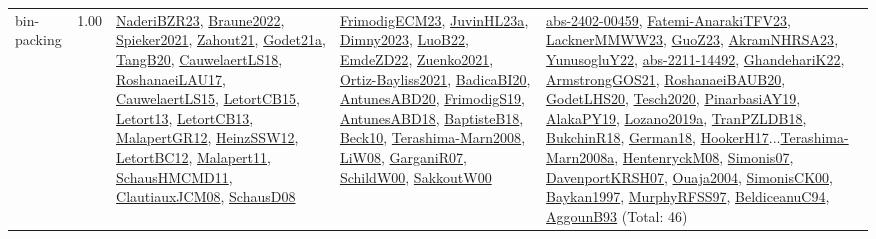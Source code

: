 {\begin{longtable}{p{3cm}r>{\raggedright\arraybackslash}p{6cm}>{\raggedright\arraybackslash}p{6cm}>{\raggedright\arraybackslash}p{8cm}}
\index{bin-packing}\index{Constraints!bin-packing}bin-packing &  1.00 & \hyperref[detail:NaderiBZR23]{NaderiBZR23}, \hyperref[detail:Braune2022]{Braune2022}, \hyperref[detail:Spieker2021]{Spieker2021}, \hyperref[detail:Zahout21]{Zahout21}, \hyperref[detail:Godet21a]{Godet21a}, \hyperref[detail:TangB20]{TangB20}, \hyperref[detail:CauwelaertLS18]{CauwelaertLS18}, \hyperref[detail:RoshanaeiLAU17]{RoshanaeiLAU17}, \hyperref[detail:CauwelaertLS15]{CauwelaertLS15}, \hyperref[detail:LetortCB15]{LetortCB15}, \hyperref[detail:Letort13]{Letort13}, \hyperref[detail:LetortCB13]{LetortCB13}, \hyperref[detail:MalapertGR12]{MalapertGR12}, \hyperref[detail:HeinzSSW12]{HeinzSSW12}, \hyperref[detail:LetortBC12]{LetortBC12}, \hyperref[detail:Malapert11]{Malapert11}, \hyperref[detail:SchausHMCMD11]{SchausHMCMD11}, \hyperref[detail:ClautiauxJCM08]{ClautiauxJCM08}, \hyperref[detail:SchausD08]{SchausD08} & \hyperref[detail:FrimodigECM23]{FrimodigECM23}, \hyperref[detail:JuvinHL23a]{JuvinHL23a}, \hyperref[detail:Dimny2023]{Dimny2023}, \hyperref[detail:LuoB22]{LuoB22}, \hyperref[detail:EmdeZD22]{EmdeZD22}, \hyperref[detail:Zuenko2021]{Zuenko2021}, \hyperref[detail:Ortiz-Bayliss2021]{Ortiz-Bayliss2021}, \hyperref[detail:BadicaBI20]{BadicaBI20}, \hyperref[detail:AntunesABD20]{AntunesABD20}, \hyperref[detail:FrimodigS19]{FrimodigS19}, \hyperref[detail:AntunesABD18]{AntunesABD18}, \hyperref[detail:BaptisteB18]{BaptisteB18}, \hyperref[detail:Beck10]{Beck10}, \hyperref[detail:Terashima-Marn2008]{Terashima-Marn2008}, \hyperref[detail:LiW08]{LiW08}, \hyperref[detail:GarganiR07]{GarganiR07}, \hyperref[detail:SchildW00]{SchildW00}, \hyperref[detail:SakkoutW00]{SakkoutW00} & \hyperref[detail:abs-2402-00459]{abs-2402-00459}, \hyperref[detail:Fatemi-AnarakiTFV23]{Fatemi-AnarakiTFV23}, \hyperref[detail:LacknerMMWW23]{LacknerMMWW23}, \hyperref[detail:GuoZ23]{GuoZ23}, \hyperref[detail:AkramNHRSA23]{AkramNHRSA23}, \hyperref[detail:YunusogluY22]{YunusogluY22}, \hyperref[detail:abs-2211-14492]{abs-2211-14492}, \hyperref[detail:GhandehariK22]{GhandehariK22}, \hyperref[detail:ArmstrongGOS21]{ArmstrongGOS21}, \hyperref[detail:RoshanaeiBAUB20]{RoshanaeiBAUB20}, \hyperref[detail:GodetLHS20]{GodetLHS20}, \hyperref[detail:Tesch2020]{Tesch2020}, \hyperref[detail:PinarbasiAY19]{PinarbasiAY19}, \hyperref[detail:AlakaPY19]{AlakaPY19}, \hyperref[detail:Lozano2019a]{Lozano2019a}, \hyperref[detail:TranPZLDB18]{TranPZLDB18}, \hyperref[detail:BukchinR18]{BukchinR18}, \hyperref[detail:German18]{German18}, \hyperref[detail:HookerH17]{HookerH17}...\hyperref[detail:Terashima-Marn2008a]{Terashima-Marn2008a}, \hyperref[detail:HentenryckM08]{HentenryckM08}, \hyperref[detail:Simonis07]{Simonis07}, \hyperref[detail:DavenportKRSH07]{DavenportKRSH07}, \hyperref[detail:Ouaja2004]{Ouaja2004}, \hyperref[detail:SimonisCK00]{SimonisCK00}, \hyperref[detail:Baykan1997]{Baykan1997}, \hyperref[detail:MurphyRFSS97]{MurphyRFSS97}, \hyperref[detail:BeldiceanuC94]{BeldiceanuC94}, \hyperref[detail:AggounB93]{AggounB93} (Total: 46)\\

\end{longtable}}
